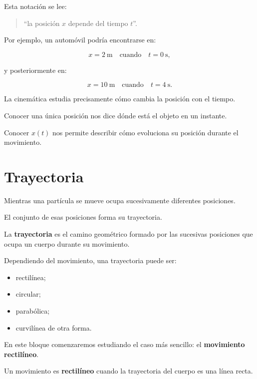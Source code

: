 Esta notación se lee:

\begin{quote}
``la posición \(x\) depende del tiempo \(t\)''.
\end{quote}

Por ejemplo, un automóvil podría encontrarse en:

\[
x=\SI{2}{\meter}
\quad\text{cuando}\quad
t=\SI{0}{\second},
\]

y posteriormente en:

\[
x=\SI{10}{\meter}
\quad\text{cuando}\quad
t=\SI{4}{\second}.
\]

La cinemática estudia precisamente cómo cambia la posición con el tiempo.

\begin{interpretacion}
Conocer una única posición nos dice dónde está el objeto en un instante.

Conocer \(x(t)\) nos permite describir cómo evoluciona su posición durante
el movimiento.
\end{interpretacion}


\section{Trayectoria}

Mientras una partícula se mueve ocupa sucesivamente diferentes posiciones.

El conjunto de esas posiciones forma su trayectoria.

\begin{definicion}[Trayectoria]
La \textbf{trayectoria} es el camino geométrico formado por las sucesivas
posiciones que ocupa un cuerpo durante su movimiento.
\end{definicion}

Dependiendo del movimiento, una trayectoria puede ser:

\begin{itemize}
    \item rectilínea;
    \item circular;
    \item parabólica;
    \item curvilínea de otra forma.
\end{itemize}

En este bloque comenzaremos estudiando el caso más sencillo:
el \textbf{movimiento rectilíneo}.

\begin{definicion}
Un movimiento es \textbf{rectilíneo} cuando la trayectoria del cuerpo es una
línea recta.
\end{definicion}

